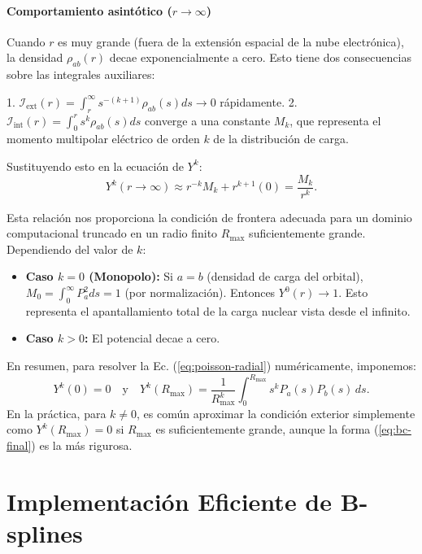 \paragraph{Comportamiento asintótico ($r \to \infty$)}

Cuando $r$ es muy grande (fuera de la extensión espacial de la nube electrónica), la densidad $\rho_{ab}(r)$ decae exponencialmente a cero. Esto tiene dos consecuencias sobre las integrales auxiliares:

1.  $\mathcal{I}_{\text{ext}}(r) = \int_r^\infty s^{-(k+1)}\rho_{ab}(s) ds \to 0$ rápidamente.
2.  $\mathcal{I}_{\text{int}}(r) = \int_0^r s^k \rho_{ab}(s) ds$ converge a una constante $M_k$, que representa el momento multipolar eléctrico de orden $k$ de la distribución de carga.

Sustituyendo esto en la ecuación de $Y^k$:
\begin{equation}
    Y^k(r \to \infty) \approx r^{-k} M_k + r^{k+1} (0) = \frac{M_k}{r^k}.
\end{equation}

Esta relación nos proporciona la condición de frontera adecuada para un dominio computacional truncado en un radio finito $R_{\text{max}}$ suficientemente grande. Dependiendo del valor de $k$:

\begin{itemize}
    \item \textbf{Caso $k=0$ (Monopolo):} Si $a=b$ (densidad de carga del orbital), $M_0 = \int_0^\infty P_a^2 ds = 1$ (por normalización). Entonces $Y^0(r) \to 1$. Esto representa el apantallamiento total de la carga nuclear vista desde el infinito.
    \item \textbf{Caso $k > 0$:} El potencial decae a cero.
\end{itemize}

En resumen, para resolver la Ec. (\cref{eq:poisson-radial}) numéricamente, imponemos:
\begin{equation}
\label{eq:bc-final}
    Y^k(0) = 0 \quad \text{y} \quad Y^k(R_{\text{max}}) = \frac{1}{R_{\text{max}}^k} \int_0^{R_{\text{max}}} s^k P_a(s) P_b(s) \, ds.
\end{equation}
En la práctica, para $k \neq 0$, es común aproximar la condición exterior simplemente como $Y^k(R_{\text{max}}) = 0$ si $R_{\text{max}}$ es suficientemente grande, aunque la forma (\cref{eq:bc-final}) es la más rigurosa.



\section{Implementación Eficiente de B-splines}
\label{ch:imp_splines}



